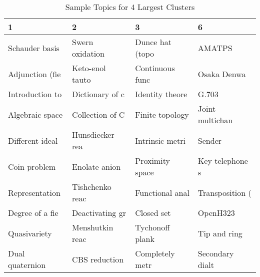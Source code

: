 \begin{table}[ht]
\centering
\caption{Sample Topics for 4 Largest Clusters} 
\label{tab:wiki_topics}
\begin{tabular}{llll}
  \hline
1 & 2 & 3 & 6 \\ 
  \hline
Schauder basis & Swern oxidation & Dunce hat (topo & AMATPS \\ 
  Adjunction (fie & Keto-enol tauto & Continuous func & Osaka Denwa \\ 
  Introduction to & Dictionary of c & Identity theore & G.703 \\ 
  Algebraic space & Collection of C & Finite topology & Joint multichan \\ 
  Different ideal & Hunsdiecker rea & Intrinsic metri & Sender \\ 
  Coin problem & Enolate anion & Proximity space & Key telephone s \\ 
  Representation  & Tishchenko reac & Functional anal & Transposition ( \\ 
  Degree of a fie & Deactivating gr & Closed set & OpenH323 \\ 
  Quasivariety & Menshutkin reac & Tychonoff plank & Tip and ring \\ 
  Dual quaternion & CBS reduction & Completely metr & Secondary dialt \\ 
   \hline
\end{tabular}
\end{table}
